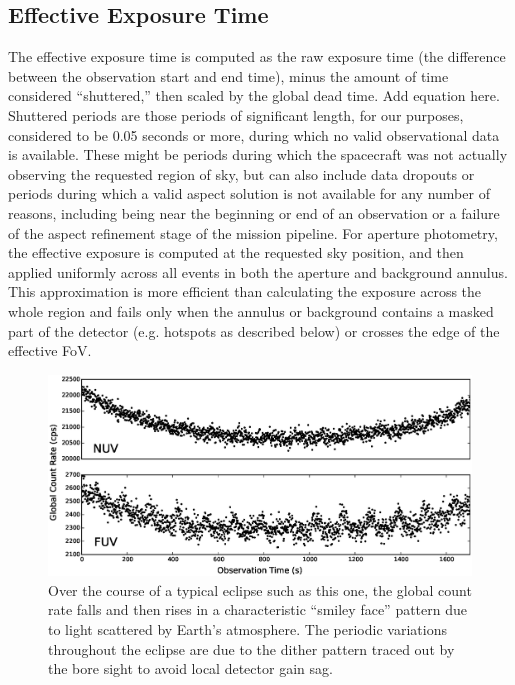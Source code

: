 \documentclass[5p]{elsarticle}
\begin{document}
\subsection{Effective Exposure Time}
\label{effexptime}
The effective exposure time is computed as the raw exposure time (the difference between the observation start and end time), minus the amount of time considered ``shuttered,'' then scaled by the global dead time.  {\color{red}Add equation here.} Shuttered periods are those periods of significant length, for our purposes, considered to be 0.05 seconds or more, during which no valid observational data is available. These might be periods during which the spacecraft was not actually observing the requested region of sky, but can also include data dropouts or periods during which a valid aspect solution is not available for any number of reasons, including being near the beginning or end of an observation or a failure of the aspect refinement stage of the mission pipeline. For aperture photometry, the effective exposure is computed at the requested sky position, and then applied uniformly across all events in both the aperture and background annulus. This approximation is more efficient than calculating the exposure across the whole region and fails only when the annulus or background contains a masked part of the detector (e.g. hotspots as described below) or crosses the edge of the effective FoV.

\begin{figure}
\includegraphics[scale=0.31]{gcr_smiley.eps}
\caption{Over the course of a typical eclipse such as this one, the global count rate falls and then rises in a characteristic ``smiley face'' pattern due to light scattered by Earth's atmosphere. The periodic variations throughout the eclipse are due to the dither pattern traced out by the bore sight to avoid local detector gain sag.\label{smiley}}
\end{figure}
\end{document}
